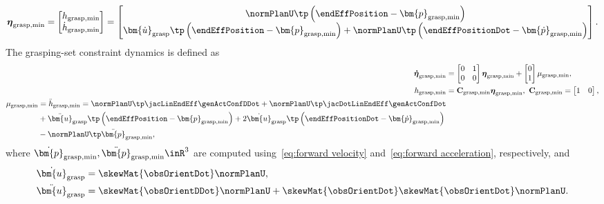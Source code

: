 		\begin{equation}\label{eq:grasp set constraint set}
			\boldsymbol{\eta}_{\rm grasp,\min} = \begin{bmatrix}
				h_{\rm grasp,\min} \\ \dot{h}_{\rm grasp,\min}
			\end{bmatrix} = 
			\begin{bmatrix}
			\normPlanU\tp\left(\endEffPosition-\bm{p}_{{\rm grasp},\min}\right) \\ 
			\bm{\dot{u}}_{{\rm grasp}}\tp \left(\endEffPosition-\bm{p}_{{\rm grasp},\min}\right) + \normPlanU\tp \left(\endEffPositionDot-\bm{\dot{p}}_{{\rm grasp},\min}\right)
			\end{bmatrix}.
		\end{equation}
		The grasping-set constraint dynamics is defined as 
		\begin{align}
			\boldsymbol{\dot{\eta}}_{\rm grasp,\min} &= \begin{bmatrix}
				0&1 \\ 0&0
			\end{bmatrix}\boldsymbol{\eta}_{\rm grasp,\min} + \begin{bmatrix}
				0 \\ 1
			\end{bmatrix}\mu_{\rm grasp,\min}, \\
			h_{\rm grasp,\min} &= \mathbf{C}_{\rm grasp,\min}\boldsymbol{\eta}_{\rm grasp,\min}, \ \mathbf{C}_{\rm grasp,\min} = \begin{bmatrix}
				1&0 
			\end{bmatrix},\\
			\begin{split}\label{eq:mu grasping-set constraint}
				\mu_{\rm grasp,\min}& =\ddot{h}_{\rm grasp,\min} = 	\normPlanU\tp\jacLinEndEff\genActConfDDot + \normPlanU\tp\jacDotLinEndEff\genActConfDot  \\ 
				&+ \ddot{\bm{u}}_{{\rm grasp}}\tp \left(\endEffPosition-\bm{p}_{{\rm grasp},\min}\right)+2 \dot{\bm{u}}_{{\rm grasp}}\tp\left(\endEffPositionDot-\bm{\dot{p}}_{{\rm grasp},\min}\right)\\
				&-\normPlanU\tp \ddot{\bm{p}}_{{\rm grasp},\min},
			\end{split}
		\end{align}
		where $\dot{\bm{p}}_{{\rm grasp},\min}, \ddot{\bm{p}}_{{\rm grasp},\min}\inR^3$ are computed using~\eqref{eq:forward velocity} and~\eqref{eq:forward acceleration}, respectively, and 
		\begin{align}
			\dot{\bm{u}}_{{\rm grasp}} &= \skewMat{\obsOrientDot}\normPlanU, \\
			\ddot{\bm{u}}_{{\rm grasp}} &= \skewMat{\obsOrientDDot}\normPlanU +\skewMat{\obsOrientDot}\skewMat{\obsOrientDot}\normPlanU.
		\end{align}
